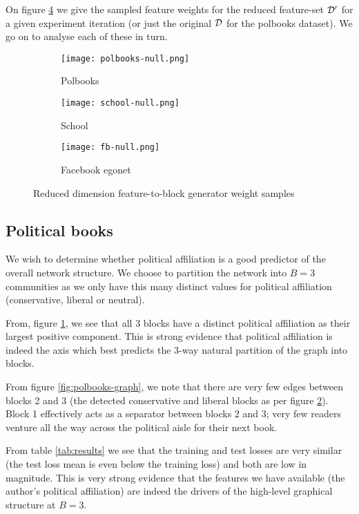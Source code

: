 On figure \ref{fig:null-all} we give the sampled feature weights for the reduced feature-set $\mathcal{D}'$ for a given experiment iteration (or just the original $\mathcal{D}$ for the polbooks dataset). We go on to analyse each of these in turn.

\begin{figure}[!h]
	\centering
	\begin{subfigure}[t]{0.32\linewidth}
		\centering
		\vskip 0pt
		\texttt{[image: polbooks-null.png]}
		\caption{Polbooks}
		\label{fig:polbooks-null}
	\end{subfigure}
	\hfill
	\begin{subfigure}[t]{0.32\linewidth}
		\centering
		\vskip 0pt
		\texttt{[image: school-null.png]}
		\caption{School}
		\label{fig:school-null}
	\end{subfigure}
	\hfill
	\begin{subfigure}[t]{0.32\linewidth}
		\centering
		\vskip 0pt
		\texttt{[image: fb-null.png]}
		\caption{Facebook egonet}
		\label{fig:fb-null}
	\end{subfigure}
	\caption{Reduced dimension feature-to-block generator weight samples}
	\label{fig:null-all}
\end{figure}

\subsection{Political books}

We wish to determine whether political affiliation is a good predictor of the overall network structure. We choose to partition the network into $B=3$ communities as we only have this many distinct values for political affiliation (conservative, liberal or neutral).

From, figure \ref{fig:polbooks-null}, we see that all 3 blocks have a distinct political affiliation as their largest positive component. This is strong evidence that political affiliation is indeed the axis which best predicts the 3-way natural partition of the graph into blocks.

From figure \ref{fig:polbooks-graph}, we note that there are very few edges between blocks 2 and 3 (the detected conservative and liberal blocks as per figure \ref{fig:school-null}). Block 1 effectively acts as a separator between blocks 2 and 3; very few readers venture all the way across the political aisle for their next book.

From table \ref{tab:results} we see that the training and test losses are very similar (the test loss mean is even below the training loss) and both are low in magnitude. This is very strong evidence that the features we have available (the author's political affiliation) are indeed the drivers of the high-level graphical structure at $B=3$.


